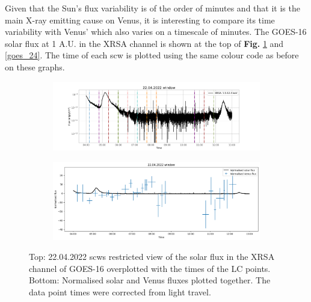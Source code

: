     Given that the Sun's flux variability is of the order of minutes and that it is the main X-ray emitting cause on Venus, it is interesting to compare its time variability with Venus' which also varies on a timescale of minutes\cite{Dennerl2002DiscoveryChandra}. The GOES-16 solar flux at 1 A.U. in the XRSA channel is shown at the top of \textbf{Fig.} \ref{goes22} and \ref{goes_24}. The time of each scw is plotted using the same colour code as before on these graphs.
    \begin{figure}[H]
        \centering
        \begin{subfigure}{0.9\textwidth}
        \centering
            \includegraphics[width=\textwidth]{report/Figures/results/GOES_22.png}
        \end{subfigure}%
        \hspace{1em}
        \begin{subfigure}{0.75\textwidth}
            \centering
            \includegraphics[width=\textwidth]{report/Figures/results/norm_22.png}
        \end{subfigure}
        \caption{Top: 22.04.2022 scws restricted view of the solar flux in the XRSA channel of GOES-16 overplotted with the times of the LC points.
        Bottom: Normalised solar and Venus fluxes plotted together. The data point times were corrected from light travel.}
        \label{goes22}
    \end{figure}


